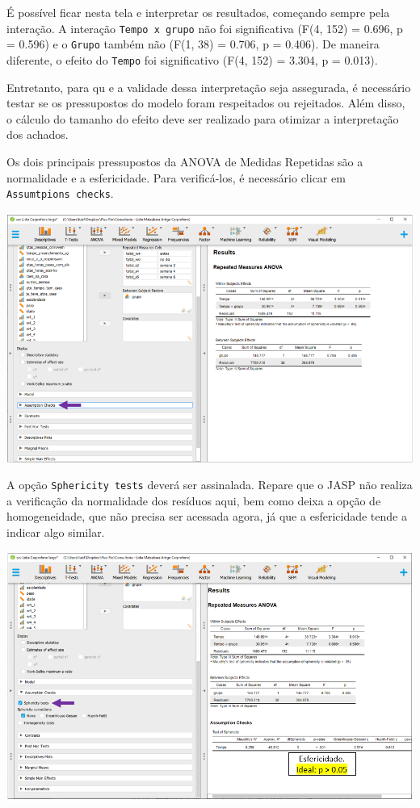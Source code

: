 \documentclass[
]{book}
\begin{document}
É possível ficar nesta tela e interpretar os resultados, começando sempre pela interação. A interação \texttt{Tempo\ x\ grupo} não foi significativa (F(4, 152) = 0.696, p = 0.596) e o \texttt{Grupo} também não (F(1, 38) = 0.706, p = 0.406). De maneira diferente, o efeito do \texttt{Tempo} foi significativo (F(4, 152) = 3.304, p = 0.013).

Entretanto, para qu e a validade dessa interpretação seja assegurada, é necessário testar se os pressupostos do modelo foram respeitados ou rejeitados. Além disso, o cálculo do tamanho do efeito deve ser realizado para otimizar a interpretação dos achados.

Os dois principais pressupostos da ANOVA de Medidas Repetidas são a normalidade e a esfericidade. Para verificá-los, é necessário clicar em \texttt{Assumtpions\ checks}.

\includegraphics{./img/cap_anovarm_pressupostos.png}

A opção \texttt{Sphericity\ tests} deverá ser assinalada. Repare que o JASP não realiza a verificação da normalidade dos resíduos aqui, bem como deixa a opção de homogeneidade, que não precisa ser acessada agora, já que a esfericidade tende a indicar algo similar.

\includegraphics{./img/cap_anovarm_esfericidade.png}
\end{document}
